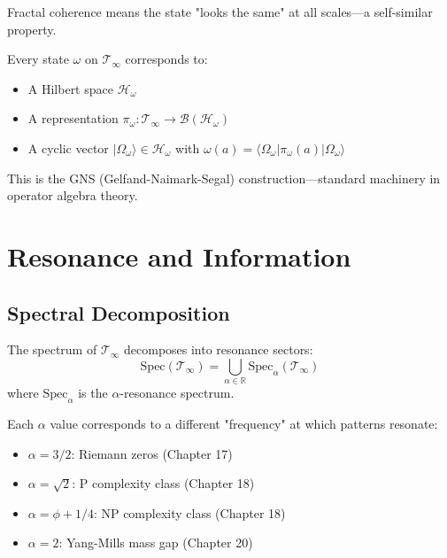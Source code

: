 Fractal coherence means the state "looks the same" at all scales—a self-similar property.

\begin{thm}\label{thm:gns-timeless}
Every state $\omega$ on $\mathcal{T}_\infty$ corresponds to:
\begin{itemize}
\item A Hilbert space $\mathcal{H}_\omega$
\item A representation $\pi_\omega: \mathcal{T}_\infty \to \mathcal{B}(\mathcal{H}_\omega)$
\item A cyclic vector $|\Omega_\omega\rangle \in \mathcal{H}_\omega$ with $\omega(a) = \langle \Omega_\omega | \pi_\omega(a) | \Omega_\omega \rangle$
\end{itemize}
\end{thm}

This is the GNS (Gelfand-Naimark-Segal) construction—standard machinery in operator algebra theory\cite{takesaki_theory_2002}.

\section{Resonance and Information}
\label{sec:resonance-info}

\subsection{Spectral Decomposition}

\begin{thm}\label{thm:spectral-decomp}
The spectrum of $\mathcal{T}_\infty$ decomposes into resonance sectors:
\begin{equation}
\text{Spec}(\mathcal{T}_\infty) = \bigcup_{\alpha \in \mathbb{R}} \text{Spec}_\alpha(\mathcal{T}_\infty)
\end{equation}
where $\text{Spec}_\alpha$ is the $\alpha$-resonance spectrum.
\end{thm}

Each $\alpha$ value corresponds to a different "frequency" at which patterns resonate:
\begin{itemize}
\item $\alpha = 3/2$: Riemann zeros (Chapter 17)
\item $\alpha = \sqrt{2}$: P complexity class (Chapter 18)
\item $\alpha = \phi + 1/4$: NP complexity class (Chapter 18)
\item $\alpha = 2$: Yang-Mills mass gap (Chapter 20)
\end{itemize}

